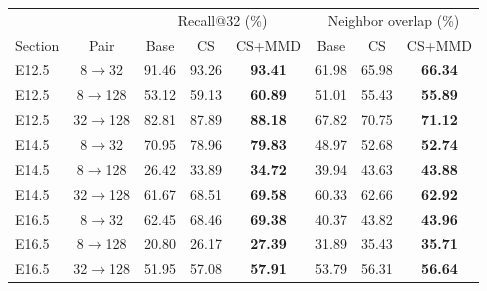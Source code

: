\begin{tabular}{lccccccc}
\toprule
 & & \multicolumn{3}{c}{Recall@32 (\%)} & \multicolumn{3}{c}{Neighbor overlap (\%)} \\
Section & Pair & Base & CS & CS+MMD & Base & CS & CS+MMD \\
\midrule
E12.5 & 8$\to$32 & 91.46 & 93.26 & \textbf{93.41} & 61.98 & 65.98 & \textbf{66.34} \\
E12.5 & 8$\to$128 & 53.12 & 59.13 & \textbf{60.89} & 51.01 & 55.43 & \textbf{55.89} \\
E12.5 & 32$\to$128 & 82.81 & 87.89 & \textbf{88.18} & 67.82 & 70.75 & \textbf{71.12} \\
E14.5 & 8$\to$32 & 70.95 & 78.96 & \textbf{79.83} & 48.97 & 52.68 & \textbf{52.74} \\
E14.5 & 8$\to$128 & 26.42 & 33.89 & \textbf{34.72} & 39.94 & 43.63 & \textbf{43.88} \\
E14.5 & 32$\to$128 & 61.67 & 68.51 & \textbf{69.58} & 60.33 & 62.66 & \textbf{62.92} \\
E16.5 & 8$\to$32 & 62.45 & 68.46 & \textbf{69.38} & 40.37 & 43.82 & \textbf{43.96} \\
E16.5 & 8$\to$128 & 20.80 & 26.17 & \textbf{27.39} & 31.89 & 35.43 & \textbf{35.71} \\
E16.5 & 32$\to$128 & 51.95 & 57.08 & \textbf{57.91} & 53.79 & 56.31 & \textbf{56.64} \\
\bottomrule
\end{tabular}
